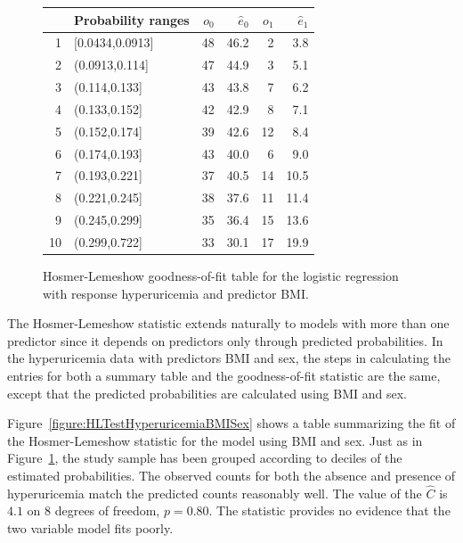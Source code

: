\begin{figure}[ht]
\centering
\begin{tabular}{rlrrrr}
  \hline
 & Probability ranges & ${o}_0$ & $\hat{e}_0$ & $o_1$ & $\hat{e}_1$ \\
  \hline
1 & [0.0434,0.0913] & 48 & 46.2 & 2 & 3.8 \\
  2 & (0.0913,0.114] & 47 & 44.9 & 3 & 5.1 \\
  3 & (0.114,0.133] & 43 & 43.8 & 7 & 6.2 \\
  4 & (0.133,0.152] & 42 & 42.9 & 8 & 7.1 \\
  5 & (0.152,0.174] & 39 & 42.6 & 12 & 8.4 \\
  6 & (0.174,0.193] & 43 & 40.0 & 6 & 9.0 \\
  7 & (0.193,0.221] & 37 & 40.5 & 14 & 10.5 \\
  8 & (0.221,0.245] & 38 & 37.6 & 11 & 11.4 \\
  9 & (0.245,0.299] & 35 & 36.4 & 15 & 13.6 \\
  10 & (0.299,0.722] & 33 & 30.1 & 17 & 19.9 \\
   \hline
\end{tabular}
\caption{Hosmer-Lemeshow goodness-of-fit table for the
       logistic regression with response hyperuricemia and predictor BMI.}
\label{figure:HLTestHyperuricemiaBmi}
\end{figure}

The Hosmer-Lemeshow statistic extends naturally to models with more than one predictor since it depends on predictors only through predicted probabilities. In the hyperuricemia data with predictors BMI and sex, the steps in calculating the entries for both a summary table and the goodness-of-fit statistic are the same, except that the predicted probabilities are calculated using BMI and sex.

Figure~\ref{figure:HLTestHyperuricemiaBMISex} shows a table summarizing the fit of the Hosmer-Lemeshow statistic for the model using BMI and sex.  Just as in Figure~\ref{figure:HLTestHyperuricemiaBmi}, the study sample has been grouped according to deciles of the estimated probabilities.  The observed counts for both the absence and presence of hyperuricemia match the predicted counts reasonably well.   The value of the $\hat{C}$ is $4.1$ on $8$ degrees of freedom, $p = 0.80$.  The statistic provides no evidence that the two variable model fits poorly.


